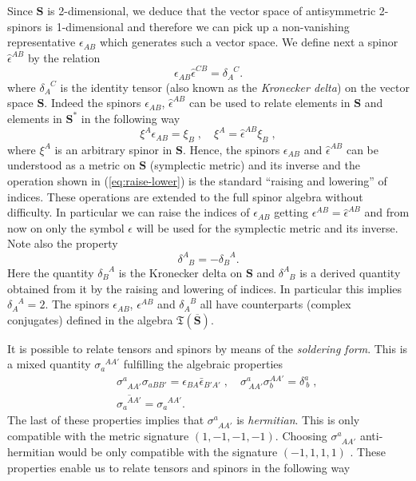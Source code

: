 \documentclass[final,3p,times,twocolumn]{elsarticle}
\begin{document}
Since ${\mathbf S}$ is 2-dimensional, we deduce that the vector space of 
antisymmetric 2-spinors is 1-dimensional and therefore we can pick up a 
non-vanishing representative $\epsilon_{AB}$ which generates such a vector space. 
We define next a spinor $\widehat{\epsilon}^{AB}$ by the relation
\begin{equation}
\epsilon_{AB}\widehat\epsilon^{CB}=\delta^{\phantom{A}C}_{A}.
\label{eq:epsinverse}
\end{equation}
where $\delta_{A}^{\phantom{A}C}$ is the identity tensor (also known as the 
{\em Kronecker delta}) on the vector space $\mathbf{S}$. Indeed the spinors $\epsilon_{AB}$, 
$\widehat{\epsilon}^{AB}$ can be used to relate elements in $\mathbf{S}$ and elements in
$\mathbf{S}^*$ in the following way
\begin{equation}
\xi^A\epsilon_{AB}=\xi_B\;,\quad \xi^A=\widehat\epsilon^{AB}\xi_B\;,
\label{eq:raise-lower}
\end{equation}
where $\xi^A$ is an arbitrary spinor in $\mathbf{S}$.     
Hence, the spinors $\epsilon_{AB}$ and $\widehat{\epsilon}^{AB}$ can be understood as 
a metric on ${\mathbf S}$ (symplectic metric) and its inverse and the operation shown in (\ref{eq:raise-lower}) is the standard 
``raising and lowering'' of indices.
These operations are extended to the full spinor algebra without difficulty.
In particular we can raise the indices of $\epsilon_{AB}$ getting 
$\epsilon^{AB}=\widehat\epsilon^{AB}$ and from now on only the symbol $\epsilon$ will be used for the symplectic metric and its inverse. Note also the property 
\begin{equation}
\delta^A_{\phantom{A}B}=-\delta_B^{\phantom{B}A}.
\label{eq:kronecker-delta}
\end{equation}
Here the quantity $\delta_B^{\phantom{B}A}$ is the Kronecker delta on 
$\mathbf S$ and $\delta^A_{\phantom{A}B}$ is a derived quantity obtained from it by the raising and lowering of indices. In particular this implies $\delta_A^{\phantom{A}A}=2$. The spinors $\epsilon_{AB}$, $\epsilon^{AB}$ and $\delta_{A}^{\phantom{A}B}$ all have counterparts 
(complex conjugates) defined in the algebra $\mathfrak{T}(\overline{\mathbf{S}})$.

It is possible to relate tensors and spinors by means of the {\em soldering form}. This is a mixed quantity  $\sigma_a^{\phantom{a}AA'}$ fulfilling the algebraic properties
\begin{eqnarray*}
&&\sigma^a_{\phantom{a}AA'}\sigma_{aBB'}=\epsilon_{BA}\bar{\epsilon}_{B'A'}
\;,\quad \sigma^a_{\ AA'}\sigma_b^{AA'}=\delta^a_{\ b}\;,\\
&&\overline{\sigma_a^{\phantom{a}AA'}}=\sigma_a^{\phantom{a}AA'}.
\end{eqnarray*}
The last of these properties implies that $\sigma^a_{\phantom{a}AA'}$ is 
{\em hermitian}. This is only compatible with the metric signature $(1,-1,-1,-1)$. Choosing $\sigma^a_{\phantom{a}AA'}$ anti-hermitian would be only compatible with the signature $(-1,1,1,1)$ \cite{ASHTEKAR}. 
These properties enable us to relate tensors and spinors in the following way
\end{document}
